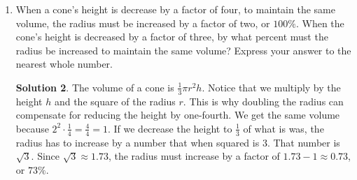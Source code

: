 \documentclass{article}
\theoremstyle{definition}
\newtheorem*{solution}{Solution}
\begin{document}
\begin{multicols}{2}
\begin{enumerate}
\begin{solution}
\begin{center}
                \end{center}
            \end{solution}
        \item When a cone's height is decrease by a factor of four, to maintain the same volume, the radius must be increased by a factor of two, or $100\%$.
            When the cone's height is decreased by a factor of three, by what percent must the radius be increased to maintain the same volume?
            Express your answer to the nearest whole number.
            \begin{solution}
                The volume of a cone is $\frac{1}{3} \pi r^2 h$.
                Notice that we multiply by the height $h$ and the square of the radius $r$.
                This is why doubling the radius can compensate for reducing the height by one-fourth.
                We get the same volume because $2^2 \cdot \frac{1}{4} = \frac{4}{4} = 1$.
                If we decrease the height to $\frac{1}{3}$ of what is was, the radius has to increase by a number that when squared is $3$.
                That number is $\sqrt{3}$.
                Since $\sqrt{3} \approx 1.73$, the radius must increase by a factor of $1.73 - 1 \approx 0.73$, or $73\%$.
            \end{solution}
    \end{enumerate}
\end{multicols}
\end{document}

